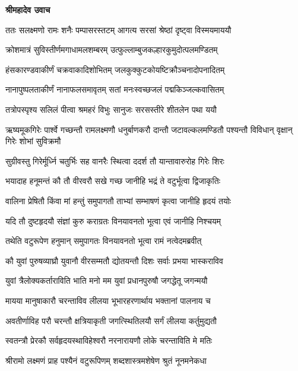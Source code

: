 




\textbf{श्रीमहादेव उवाच}

\twolineshloka
{ततः सलक्ष्मणो रामः शनैः पम्पासरस्तटम्}
{आगत्य सरसां श्रेष्ठां दृष्ट्वा विस्मयमाययौ} %

\twolineshloka
{क्रोशमात्रं सुविस्तीर्णमगाधामलशम्बरम्}
{उत्फुल्लाम्बुजकल्हारकुमुदोत्पलमण्डितम्} %

\twolineshloka
{हंसकारण्डवाकीर्णं चक्रवाकादिशोभितम्}
{जलकुक्कुटकोयष्टिक्रौञ्चनादोपनादितम्} %

\twolineshloka
{नानापुष्पलताकीर्णं नानाफलसमावृतम्}
{सतां मनःस्वच्छजलं पद्मकिञ्जल्कवासितम्} %

\twolineshloka
{तत्रोपस्पृश्य सलिलं पीत्वा श्रमहरं विभुः}
{सानुजः सरसस्तीरे शीतलेन पथा ययौ} %

\threelineshloka
{ऋष्यमूकगिरेः पार्श्वे गच्छन्तौ रामलक्ष्मणौ}
{धनुर्बाणकरौ दान्तौ जटावल्कलमण्डितौ}
{पश्यन्तौ विविधान् वृक्षान् गिरेः शोभां सुविक्रमौ} %

\twolineshloka
{सुग्रीवस्तु गिरेर्मूर्ध्नि चतुर्भिः सह वानरैः}
{स्थित्वा ददर्श तौ यान्तावारुरोह गिरेः शिरः} %

\twolineshloka
{भयादाह हनूमन्तं कौ तौ वीरवरौ सखे}
{गच्छ जानीहि भद्रं ते वटुर्भूत्वा द्विजाकृतिः} %

\twolineshloka
{वालिना प्रेषितौ किंवा मां हन्तुं समुपागतौ}
{ताभ्यां सम्भाषणं कृत्वा जानीहि हृदयं तयोः} %

\twolineshloka
{यदि तौ दुष्टहृदयौ संज्ञां कुरु कराग्रतः}
{विनयावनतो भूत्वा एवं जानीहि निश्चयम्} %

\twolineshloka
{तथेति वटुरूपेण हनुमान् समुपागतः}
{विनयावनतो भूत्वा रामं नत्वेदमब्रवीत्} %

\twolineshloka
{कौ युवां पुरुषव्याघ्रौ युवानौ वीरसम्मतौ}
{द्योतयन्तौ दिशः सर्वाः प्रभया भास्कराविव} %

\twolineshloka
{युवां त्रैलोक्यकर्ताराविति भाति मनो मम}
{युवां प्रधानपुरुषौ जगद्धेतू जगन्मयौ} %

\twolineshloka
{मायया मानुषाकारौ चरन्ताविव लीलया}
{भूभारहरणार्थाय भक्तानां पालनाय च} %

\twolineshloka
{अवतीर्णाविह परौ चरन्तौ क्षत्रियाकृती}
{जगत्स्थितिलयौ सर्गं लीलया कर्तुमुद्यतौ} %

\twolineshloka
{स्वतन्त्रौ प्रेरकौ सर्वहृदयस्थाविहेश्वरौ}
{नरनारायणौ लोके चरन्ताविति मे मतिः} %

\twolineshloka
{श्रीरामो लक्ष्मणं प्राह पश्यैनं वटुरूपिणम्}
{शब्दशास्त्रमशेषेण श्रुतं नूनमनेकधा} %

